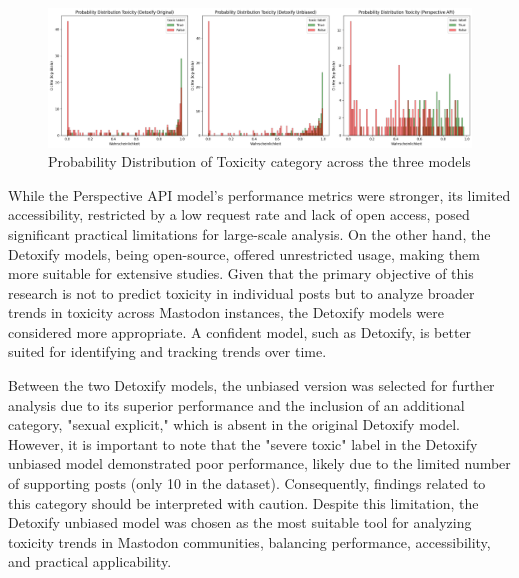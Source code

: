 \begin{figure}[h]
    \centering
    \includegraphics[width=\textwidth]{../material/probability_distribution.png}
    \caption{Probability Distribution of Toxicity category across the three models}
    \label{fig:probability-distribution}
\end{figure}

While the Perspective API model's performance metrics were stronger, its limited accessibility, restricted by a low request rate and lack of open access, posed significant practical limitations for large-scale analysis. On the other hand, the Detoxify models, being open-source, offered unrestricted usage, making them more suitable for extensive studies. Given that the primary objective of this research is not to predict toxicity in individual posts but to analyze broader trends in toxicity across Mastodon instances, the Detoxify models were considered more appropriate. A confident model, such as Detoxify, is better suited for identifying and tracking trends over time.

Between the two Detoxify models, the unbiased version was selected for further analysis due to its superior performance and the inclusion of an additional category, "sexual explicit," which is absent in the original Detoxify model. However, it is important to note that the "severe toxic" label in the Detoxify unbiased model demonstrated poor performance, likely due to the limited number of supporting posts (only 10 in the dataset). Consequently, findings related to this category should be interpreted with caution. Despite this limitation, the Detoxify unbiased model was chosen as the most suitable tool for analyzing toxicity trends in Mastodon communities, balancing performance, accessibility, and practical applicability.


